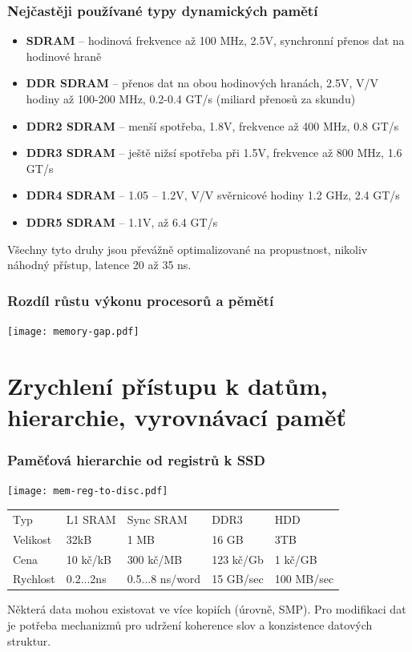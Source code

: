 \documentclass{beamer}
\begin{document}
\begin{frame}
\frametitle{Nejčastěji používané typy dynamických pamětí}

\begin{itemize}
\item \textbf{SDRAM} -- hodinová frekvence až 100 MHz, 2.5V, synchronní přenos dat na hodinové hraně
\item \textbf{DDR SDRAM} -- přenos dat na obou hodinových hranách, 2.5V, V/V hodiny až 100-200 MHz, 0.2-0.4 GT/s (miliard přenosů za skundu)
\item \textbf{DDR2 SDRAM} -- menší spotřeba, 1.8V, frekvence až 400 MHz, 0.8 GT/s
\item \textbf{DDR3 SDRAM} -- ještě nižsí spotřeba při 1.5V, frekvence až 800 MHz, 1.6 GT/s
\item \textbf{DDR4 SDRAM} -- 1.05 -- 1.2V,  V/V svěrnicové hodiny 1.2 GHz, 2.4 GT/s
\item \textbf{DDR5 SDRAM} -- 1.1V, až 6.4 GT/s
\end{itemize}

Všechny tyto druhy jsou převážně optimalizované na propustnost, nikoliv náhodný přístup, latence 20 až 35 ns.

\end{frame}


\begin{frame}
\frametitle{Rozdíl růstu výkonu procesorů a pěmětí}

\centering

\texttt{[image: memory-gap.pdf]}

\end{frame}

\section{Zrychlení přístupu k datům, hierarchie, vyrovnávací paměť}

\begin{frame}
\frametitle{Paměťová hierarchie od registrů k SSD}

{
\centering

\texttt{[image: mem-reg-to-disc.pdf]}

}
\vskip 2mm

\begin{tabular}{l|llll}
Typ      & L1 SRAM   & Sync SRAM &  DDR3      & HDD \\
Velikost & 32kB      & 1 MB      &  16 GB     & 3TB \\
Cena     & 10 kč/kB  & 300 kč/MB &  123 kč/Gb & 1 kč/GB \\
Rychlost & 0.2...2ns & 0.5...8 ns/word & 15 GB/sec & 100 MB/sec \\
\end{tabular}

\vskip 2mm

Některá data mohou existovat ve více kopiích (úrovně, SMP).
Pro modifikaci dat je potřeba mechanizmů pro udržení koherence slov a konzistence datových struktur.

\end{frame}
\end{document}
